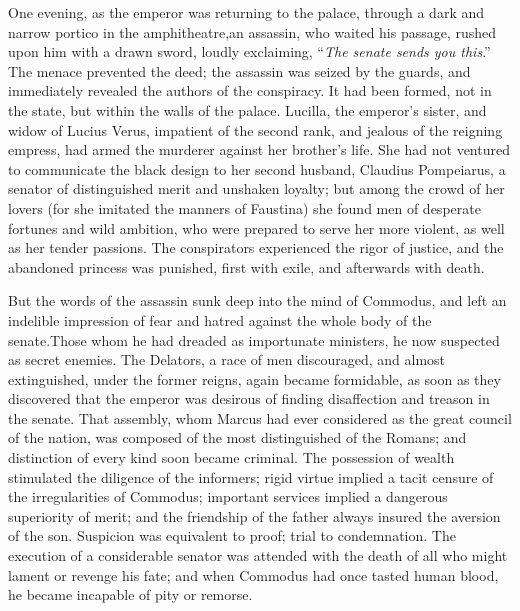 
One evening, as the emperor was returning to the palace, through
a dark and narrow portico in the amphitheatre,\footnotemark[14] an assassin,
who waited his passage, rushed upon him with a drawn sword,
loudly exclaiming, “\textit{The senate sends you this}.” The menace
prevented the deed; the assassin was seized by the guards, and
immediately revealed the authors of the conspiracy. It had been
formed, not in the state, but within the walls of the palace.
Lucilla, the emperor’s sister, and widow of Lucius Verus,
impatient of the second rank, and jealous of the reigning
empress, had armed the murderer against her brother’s life. She
had not ventured to communicate the black design to her second
husband, Claudius Pompeiarus, a senator of distinguished merit
and unshaken loyalty; but among the crowd of her lovers (for she
imitated the manners of Faustina) she found men of desperate
fortunes and wild ambition, who were prepared to serve her more
violent, as well as her tender passions. The conspirators
experienced the rigor of justice, and the abandoned princess was
punished, first with exile, and afterwards with death.\footnotemark[15]



But the words of the assassin sunk deep into the mind of
Commodus, and left an indelible impression of fear and hatred
against the whole body of the senate.\footnotemark[151] Those whom he had
dreaded as importunate ministers, he now suspected as secret
enemies. The Delators, a race of men discouraged, and almost
extinguished, under the former reigns, again became formidable,
as soon as they discovered that the emperor was desirous of
finding disaffection and treason in the senate. That assembly,
whom Marcus had ever considered as the great council of the
nation, was composed of the most distinguished of the Romans; and
distinction of every kind soon became criminal. The possession of
wealth stimulated the diligence of the informers; rigid virtue
implied a tacit censure of the irregularities of Commodus;
important services implied a dangerous superiority of merit; and
the friendship of the father always insured the aversion of the
son. Suspicion was equivalent to proof; trial to condemnation.
The execution of a considerable senator was attended with the
death of all who might lament or revenge his fate; and when
Commodus had once tasted human blood, he became incapable of pity
or remorse.

